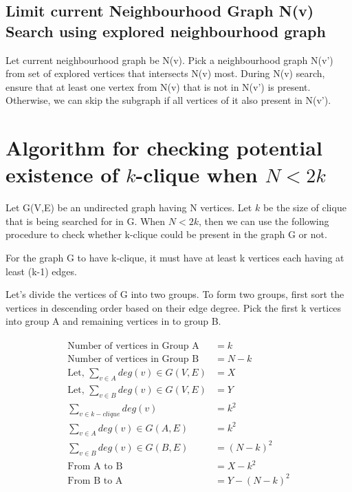 \documentclass[12pt]{article}
\theoremstyle{plain}
\theoremstyle{definition}
\begin{document}
\subsection{Limit current Neighbourhood Graph N(v) Search using explored neighbourhood graph}\label{AlgorithmOptimizationLimitNodes}

Let current neighbourhood graph be N(v). Pick a neighbourhood graph N(v') from set of explored vertices that intersects N(v) most. During N(v) search, ensure that at least one vertex from N(v) that is not in N(v') is present. Otherwise, we can skip the subgraph if all vertices of it also present in N(v').

\section{Algorithm for checking potential existence of $k$-clique when $N < 2k$} \label{AnyGraph2kFailure}
Let G(V,E) be an undirected graph having N vertices. Let $k$ be the size of clique that is being searched for in G. When $N < 2k$, then we can use the following procedure to check whether k-clique could be present in the graph G or not.

For the graph G to have k-clique, it must have at least k vertices each having at least (k-1) edges.

Let's divide the vertices of G into two groups. To form two groups, first sort the vertices in descending order based on their edge degree. Pick the first k vertices into group A and remaining vertices in to group B.

\begin{align} 
\begin{split}
	\text{Number of vertices in Group A} &= k \\
	\text{Number of vertices in Group B} &= N - k \\
	\text{Let, } \sum_{v \in A} deg (v) \in G(V,E) &= X \\
	\text{Let, } \sum_{v \in B} deg (v) \in G(V,E) &= Y \\
	\sum_{v \in k-clique} deg (v) &= k^2 \\
	\sum_{v \in A} deg (v) \in G(A, E) &= k^2 \\
	\sum_{v \in B} deg (v) \in G(B, E) &= (N-k)^2 \\
	\text{From A to B } &= X - k^2 \\
	\text{From B to A } &= Y - (N-k)^2 \\
\end{split}
\end{align}
\end{document}
